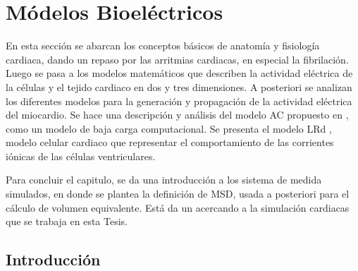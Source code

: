 \chapter{Módelos Bioeléctricos}

\begin{resumen}
  En esta sección se abarcan los conceptos básicos de anatomía y fisiología cardiaca, dando un repaso por las arritmias cardiacas, en especial la fibrilación. Luego se pasa a los modelos matemáticos que describen la actividad eléctrica de la células y el tejido  cardiaco en dos y tres dimensiones.
  A posteriori se analizan los diferentes modelos para la generación y propagación de la actividad eléctrica del miocardio. Se hace una descripción y análisis del modelo \ac{AC} propuesto en \cite{Alonso-Atienza05},  como un
  modelo de baja carga computacional. Se presenta el modelo \ac{LRd} \cite{luo1994, livshitz2007}, modelo celular cardiaco que representar el comportamiento de las corrientes iónicas de las células ventriculares. 
  
  Para concluir el capitulo, se da una introducción a los sistema de medida simulados, en donde se plantea la definición de \ac{MSD}, usada a posteriori para el cálculo de volumen equivalente. Está da un acercando a la simulación cardiacas que se trabaja en esta Tesis.




\end{resumen}


\section{Introducción}

